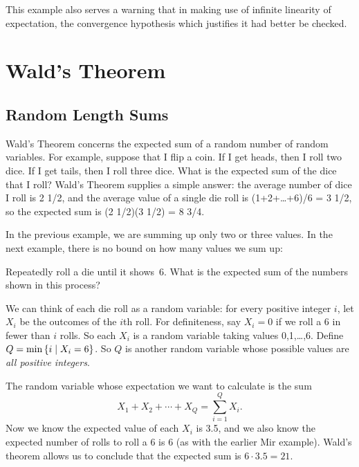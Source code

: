 \documentclass[11pt,twoside]{article}
\begin{document}
This example also serves a warning that in making use of infinite
linearity of expectation, the convergence hypothesis which justifies it
had better be checked.


\section{Wald's Theorem}

\subsection{Random Length Sums}

Wald's Theorem concerns the expected sum of a random number of random
variables.  For example, suppose that I flip a coin.  If I get heads, then
I roll two dice.  If I get tails, then I roll three dice.  What is the
expected sum of the dice that I roll?  Wald's Theorem supplies a simple
answer: the average number of dice I roll is 2 1/2, and the average value
of a single die roll is (1+2+\dots+6)/6 = 3 1/2, so the expected sum is (2
1/2)(3 1/2) = 8 3/4.

In the previous example, we are summing up only two or three values.  In
the next example, there is no bound on how many values we sum up:
\begin{example}
\label{ex:wald-dice} Repeatedly roll a die until it shows~6.  What is
the expected sum of the numbers shown in this process?

We can think of each die roll as a random variable: for every positive
integer $i$, let $X_i$ be the outcomes of the $i$th roll.  For
definiteness, say $X_i = 0$ if we roll a 6 in fewer than $i$ rolls.  So
each $X_i$ is a random variable taking values 0,1,\dots,6.  Define $Q =
\min\left\{i \mid X_i = 6\right\}$.  So $Q$ is another random variable whose
possible values are \emph{all positive integers}.

The random variable whose expectation we want to calculate is the sum
\[
X_1 + X_2 + \cdots + X_Q = \sum_{i=1}^Q X_i.
\]
Now we know the expected value of each $X_i$ is 3.5, and we also know the
expected number of rolls to roll a 6 is 6 (as with the earlier Mir
example).  Wald's theorem allows us to conclude that the expected sum is
$6\cdot 3.5=21$.
\end{example}

\end{document}
